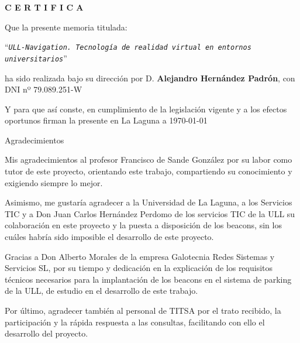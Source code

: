 \documentclass[spanish,a4paper,12pt,oneside]{extreport}
\newcommand{\BulletP}{\texttt{ULL-Navigation.{ Tecnología de realidad virtual en entornos universitarios}}}
\begin{document}
\bigskip

\bigskip
\bigskip
{\bf C E R T I F I C A}

\bigskip
\bigskip
\bigskip
Que la presente memoria titulada:

\bigskip
``{\it \BulletP{}}''

\bigskip
\bigskip
\bigskip
\noindent ha sido realizada bajo su dirección por D. {\bf Alejandro Hernández Padrón},
con DNI nº 79.089.251-W

\bigskip
\bigskip

Y para que así conste, en cumplimiento de la legislación vigente y a los efectos
oportunos firman la presente en La Laguna a \today

\newpage
\thispagestyle{empty}

{ \flushright

\begin{LARGE}
Agradecimientos
\end{LARGE}

\hspace{3mm}

\begin{large}


\hspace{3mm}

Mis agradecimientos al profesor Francisco de Sande González por su labor como tutor de este proyecto, orientando este trabajo, compartiendo su conocimiento y exigiendo siempre lo mejor. 

Asimismo, me gustaría agradecer a la Universidad de La Laguna, a los Servicios TIC y a Don Juan Carlos Hernández Perdomo de los servicios TIC de la ULL su colaboración en este proyecto y la puesta a disposición de los beacons, sin los cuáles habría sido imposible el desarrollo de este proyecto. 

Gracias a Don Alberto Morales de la empresa Galotecnia Redes Sistemas y Servicios SL, por su tiempo y dedicación en la explicación de los requisitos técnicos necesarios para la implantación de los beacons en el sistema de parking de la ULL, de estudio en el desarrollo de este trabajo.

Por último, agradecer también al personal de TITSA por el trato recibido, la participación y la rápida respuesta a las consultas, facilitando con ello el desarrollo del proyecto.


\end{large}

}
\end{document}
